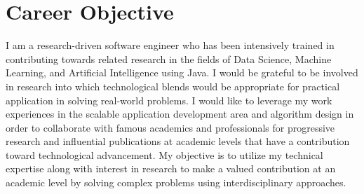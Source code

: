 \section{\textbf{Career Objective}}
I am a research-driven software engineer who has been intensively trained in contributing
towards related research in the fields of Data Science, Machine Learning, and Artificial
Intelligence using Java. I would be grateful to be involved in research into
which technological blends would be appropriate for practical application in
solving real-world problems. I would like to leverage my work experiences in the
scalable application development area and algorithm design in order to collaborate
with famous academics and professionals for progressive research and influential
publications at academic levels that have a contribution toward technological advancement.
My objective is to utilize my technical expertise along with interest in
research to make a valued contribution at an academic level by solving
complex problems using interdisciplinary approaches.
